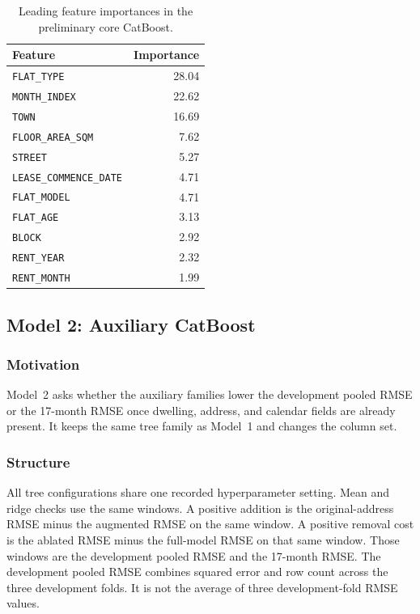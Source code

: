 \documentclass[11pt,a4paper]{article}
\begin{document}
\begin{table}[htbp]
\centering
\caption{Leading feature importances in the preliminary core CatBoost.}
\label{tab:baseline-importance}
\small
\begin{tabular}{lr}
\toprule
Feature & Importance \\
\midrule
\texttt{FLAT\_TYPE} & 28.04 \\
\texttt{MONTH\_INDEX} & 22.62 \\
\texttt{TOWN} & 16.69 \\
\texttt{FLOOR\_AREA\_SQM} & 7.62 \\
\texttt{STREET} & 5.27 \\
\texttt{LEASE\_COMMENCE\_DATE} & 4.71 \\
\texttt{FLAT\_MODEL} & 4.71 \\
\texttt{FLAT\_AGE} & 3.13 \\
\texttt{BLOCK} & 2.92 \\
\texttt{RENT\_YEAR} & 2.32 \\
\texttt{RENT\_MONTH} & 1.99 \\
\bottomrule
\end{tabular}
\end{table}

\subsection{Model 2: Auxiliary CatBoost}
\label{sec:aux-model}

\subsubsection{Motivation}

Model~2 asks whether the auxiliary families lower the development pooled RMSE or the 17-month RMSE once dwelling, address, and calendar fields are already present.
It keeps the same tree family as Model~1 and changes the column set.

\subsubsection{Structure}

All tree configurations share one recorded hyperparameter setting.
Mean and ridge checks use the same windows.
A positive addition is the original-address RMSE minus the augmented RMSE on the same window.
A positive removal cost is the ablated RMSE minus the full-model RMSE on that same window.
Those windows are the development pooled RMSE and the 17-month RMSE.
The development pooled RMSE combines squared error and row count across the three development folds.
It is not the average of three development-fold RMSE values.
\end{document}
